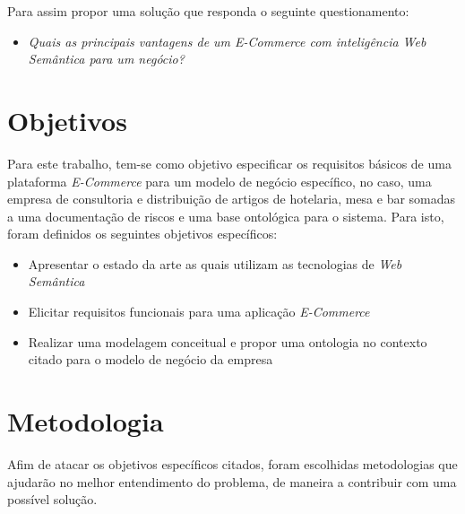 	Para assim propor uma solução que responda o seguinte questionamento:
	\begin{itemize}
	\item{\textit{Quais as principais vantagens de um E-Commerce com inteligência Web Semântica para um negócio?}}
	\end{itemize}

\section{Objetivos}

Para este trabalho, tem-se como objetivo especificar os requisitos básicos de uma plataforma \textit{E-Commerce} para um modelo de negócio específico, no caso, uma empresa de consultoria e distribuição de artigos de hotelaria, mesa e bar somadas a uma documentação de riscos e uma base ontológica para o sistema. Para isto, foram definidos os seguintes objetivos específicos:

	\begin{itemize}
	\item{Apresentar o estado da arte as quais utilizam as tecnologias de \textit{Web Semântica}}
	\item{Elicitar requisitos funcionais para uma aplicação \textit{E-Commerce}}
	\item{Realizar uma modelagem conceitual e propor uma ontologia no contexto citado para o modelo de negócio da empresa}
	\end{itemize}

\section{Metodologia}

Afim de atacar os objetivos específicos citados, foram escolhidas metodologias que ajudarão no melhor entendimento do problema, de maneira a contribuir com uma possível solução.

